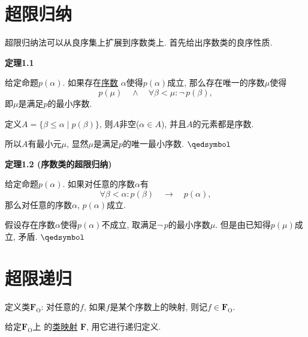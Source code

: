 \documentclass[UTF8]{ctexart}
\begin{document}
\setlength{\abovedisplayskip}{1pt}
\setlength{\belowdisplayskip}{1pt}

\section{超限归纳}

超限归纳法可以从良序集上扩展到序数类上. 首先给出序数类的良序性质.

\vspace{10pt}

\hypertarget{sec:定理1.1}{}
\noindent\textbf{定理1.1}

给定命题$p(\alpha)$. 如果存在\href{01 序数#nameddest=sec:定义1.1}{序数}
$\alpha$使得$p(\alpha)$成立, 那么存在唯一的序数$\mu$使得
\[
    p(\mu)\quad\land\quad\forall\beta<\mu:\neg\,p(\beta),
\]
即$\mu$是满足$p$的最小序数.


定义$A=\{\beta\leqslant\alpha\mid p(\beta)\}$, 则$A$非空($\alpha\in A$),
并且$A$的元素都是序数.

所以$A$有最小元$\mu$, 显然$\mu$是满足$p$的唯一最小序数. \hfill $\qedsymbol$

\vspace{10pt}

\hypertarget{sec:定理1.2}{}
\noindent\textbf{定理1.2 (序数类的超限归纳)}

给定命题$p(\alpha)$. 如果对任意的序数$\alpha$有
\[
    \forall\beta<\alpha:p(\beta)\quad\to\quad p(\alpha),
\]
那么对任意的序数$\alpha$, $p(\alpha)$成立.


假设存在序数$\alpha$使得$p(\alpha)$不成立, 取满足$\neg\,p$的最小序数$\mu$.
但是由已知得$p(\mu)$成立, 矛盾. \hfill $\qedsymbol$





\vspace{50pt}

\section{超限递归}

定义类$\mathbf{F}_{\mathrm{O}}$: 对任意的$f$, 如果$f$是某个序数上的映射,
则记$f\in\mathbf{F}_{\mathrm{O}}$.

给定$\mathbf{F}_{\mathrm{O}}$上
的\href{../../01 ZFC 公理/02 类#nameddest=sec:类映射}{类映射} $\mathbf{F}$,
用它进行递归定义.

\vspace{10pt}
\end{document}

